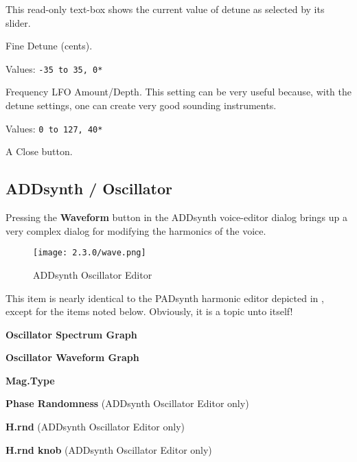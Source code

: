    This read-only text-box shows the current value of detune as selected by
   its slider.

   Fine Detune (cents).

   Values: \texttt{-35 to 35, 0*}

   Frequency LFO Amount/Depth.
   This setting can be very useful because, with the detune settings, one can
   create very good sounding instruments.

   Values: \texttt{0 to 127, 40*}

   A Close button.

\subsection{ADDsynth / Oscillator}
\label{subsec:addsynth_oscillator}

   Pressing the \textbf{Waveform} button in the ADDsynth
   voice-editor dialog brings up a very complex dialog for modifying the
   harmonics of the voice.

\begin{figure}[H]
   \centering
   \texttt{[image: 2.3.0/wave.png]}
   \caption{ADDsynth Oscillator Editor}
   \label{fig:addsynth_oscillator_editor}
\end{figure}

   This item is nearly identical to the PADsynth harmonic editor depicted in
   ,
   except for the items noted below.
   Obviously, it is a topic unto itself!

   \begin{enumber}
      \item \textbf{Oscillator Spectrum Graph}
      \item \textbf{Oscillator Waveform Graph}
      \item \textbf{Mag.Type}
      \item \textbf{Phase Randomness} (ADDsynth Oscillator Editor only)
      \item \textbf{H.rnd} (ADDsynth Oscillator Editor only)
      \item \textbf{H.rnd knob} (ADDsynth Oscillator Editor only)
   \end{enumber}

   \setcounter{ItemCounter}{0}      %

